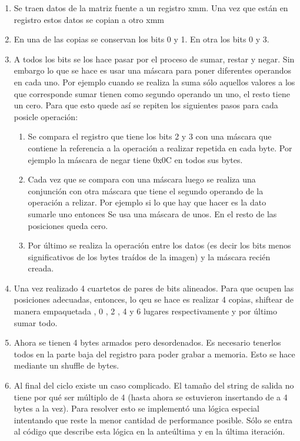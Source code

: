 \begin{enumerate}

	\item Se traen datos de la matriz fuente a un registro xmm. Una vez que
	están en registro estos datos se copian a otro xmm

	\item En una de las copias se conservan los bits 0 y 1. En otra los bits 0 y 3.

	\item A todos los bits se los hace pasar por el proceso de sumar, restar
	y negar. Sin embargo lo que se hace es usar una máscara para poner diferentes operandos
	en cada uno. Por ejemplo cuando se realiza la suma sólo aquellos valores
	a los que corresponde sumar tienen como segundo operando un uno, el resto tiene
	un cero. Para que esto quede así se repiten los siguientes pasos para cada
	posicle operación:

	\begin{enumerate}

		\item Se compara el registro que tiene los bits 2 y 3 con una
		máscara que contiene la referencia a la operación a realizar repetida
		en cada byte. Por ejemplo la máscara de negar tiene 0x0C en todos sus bytes.

		\item Cada vez que se compara con una máscara luego se realiza una conjunción
		con otra máscara que tiene el segundo operando de la operación a relizar.
		Por ejemplo si lo que hay que hacer es la dato sumarle uno entonces
		Se usa una máscara de unos. En el resto de las posiciones queda cero.

		\item Por último se realiza la operación entre los datos (es decir los bits
		menos significativos de los bytes traídos de la imagen) y la máscara recién
		creada.

	\end{enumerate}

	\item Una vez realizado 4 cuartetos de pares de bits alineados. Para que ocupen las
	posiciones adecuadas, entonces, lo qeu se hace es realizar 4 copias, shiftear de
	manera empaquetada , 0 , 2 , 4 y 6 lugares respectivamente y por último sumar todo.
	
	\item Ahora se tienen 4 bytes armados pero desordenados. Es necesario tenerlos todos
	en la parte baja del registro para poder grabar a memoria. Esto se hace mediante un shuffle
	de bytes.

	\item Al final del ciclo existe un caso complicado. El tamaño del string de salida
	no tiene por qué ser múltiplo de 4 (hasta ahora se estuvieron insertando de a 4
	bytes a la vez). Para resolver esto se implementó una lógica especial
	intentando que reste la menor cantidad de performance posible. Sólo se entra al código
	que describe esta lógica en la anteúltima y en la última iteración.

\end{enumerate}


